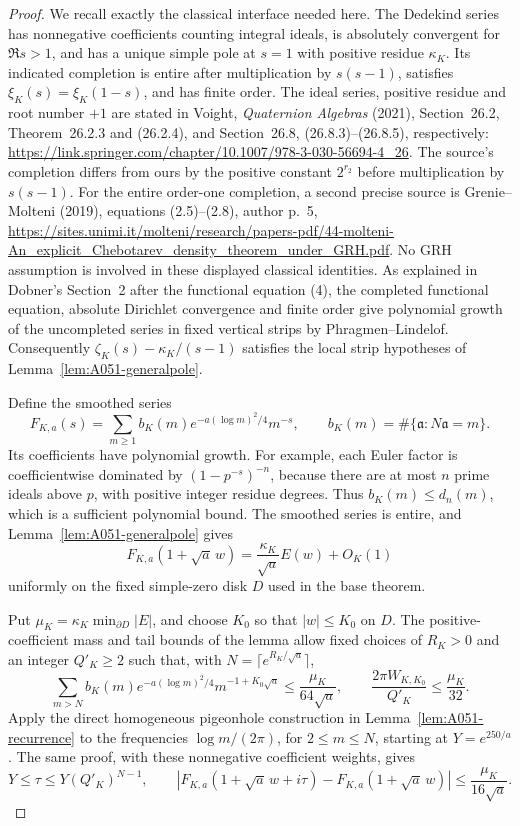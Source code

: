 \begin{proof}
We recall exactly the classical interface needed here.
The Dedekind series has nonnegative coefficients counting integral
ideals, is absolutely convergent for \(\Re s>1\), and has a unique
simple pole at \(s=1\) with positive residue \(\kappa_K\).
Its indicated completion is entire after multiplication by
\(s(s-1)\), satisfies \(\xi_K(s)=\xi_K(1-s)\), and has finite
order. The ideal series, positive residue and root number \(+1\)
are stated in Voight, \emph{Quaternion Algebras} (2021),
Section~26.2, Theorem~26.2.3 and (26.2.4), and
Section~26.8, (26.8.3)--(26.8.5), respectively:
\url{https://link.springer.com/chapter/10.1007/978-3-030-56694-4_26}.
The source's completion differs from ours by the positive
constant \(2^{r_2}\) before multiplication by \(s(s-1)\).
For the entire order-one completion, a second precise source is
Grenie--Molteni (2019),
equations (2.5)--(2.8), author p.\ 5,
\url{https://sites.unimi.it/molteni/research/papers-pdf/44-molteni-An_explicit_Chebotarev_density_theorem_under_GRH.pdf}.
No GRH assumption is involved in these displayed classical
identities. As explained in Dobner's Section~2 after the functional
equation (4), the completed functional equation, absolute Dirichlet
convergence and finite order give polynomial growth of the
uncompleted series in fixed vertical strips by
Phragmen--Lindelof. Consequently
\(\zeta_K(s)-\kappa_K/(s-1)\) satisfies the local strip hypotheses
of Lemma~\ref{lem:A051-generalpole}.

Define the smoothed series
\[
 F_{K,a}(s)=\sum_{m\ge1}b_K(m)e^{-a(\log m)^2/4}m^{-s},
 \qquad b_K(m)=\#\{\mathfrak a:N\mathfrak a=m\}.
\]
Its coefficients have polynomial growth. For example, each Euler
factor is coefficientwise dominated by \((1-p^{-s})^{-n}\),
because there are at most \(n\) prime ideals above \(p\), with
positive integer residue degrees. Thus \(b_K(m)\le d_n(m)\),
which is a sufficient polynomial bound. The smoothed series is
entire, and Lemma~\ref{lem:A051-generalpole} gives
\[
             F_{K,a}(1+\sqrt a\,w)
                   =\frac{\kappa_K}{\sqrt a}E(w)+O_K(1)
\]
uniformly on the fixed simple-zero disk \(D\) used in the base
theorem.

Put \(\mu_K=\kappa_K\min_{\partial D}|E|\), and choose \(K_0\)
so that \(|w|\le K_0\) on \(D\).
The positive-coefficient mass and tail bounds of the lemma allow
fixed choices of \(R_K>0\) and an integer \(Q'_K\ge2\) such that,
with \(N=\lceil e^{R_K/\sqrt a}\rceil\),
\[
 \sum_{m>N}b_K(m)e^{-a(\log m)^2/4}m^{-1+K_0\sqrt a}
          \le\frac{\mu_K}{64\sqrt a},\qquad
 \frac{2\pi W_{K,K_0}}{Q'_K}\le\frac{\mu_K}{32}.
\]
Apply the direct homogeneous pigeonhole construction in
Lemma~\ref{lem:A051-recurrence} to the frequencies
\(\log m/(2\pi)\), for \(2\le m\le N\), starting at
\(Y=e^{250/a}\). The same proof, with these nonnegative coefficient
weights, gives
\[
 Y\le\tau\le Y(Q'_K)^{N-1},\qquad
 |F_{K,a}(1+\sqrt a\,w+i\tau)-F_{K,a}(1+\sqrt a\,w)|
                        \le\frac{\mu_K}{16\sqrt a}.
\]


\end{proof}
